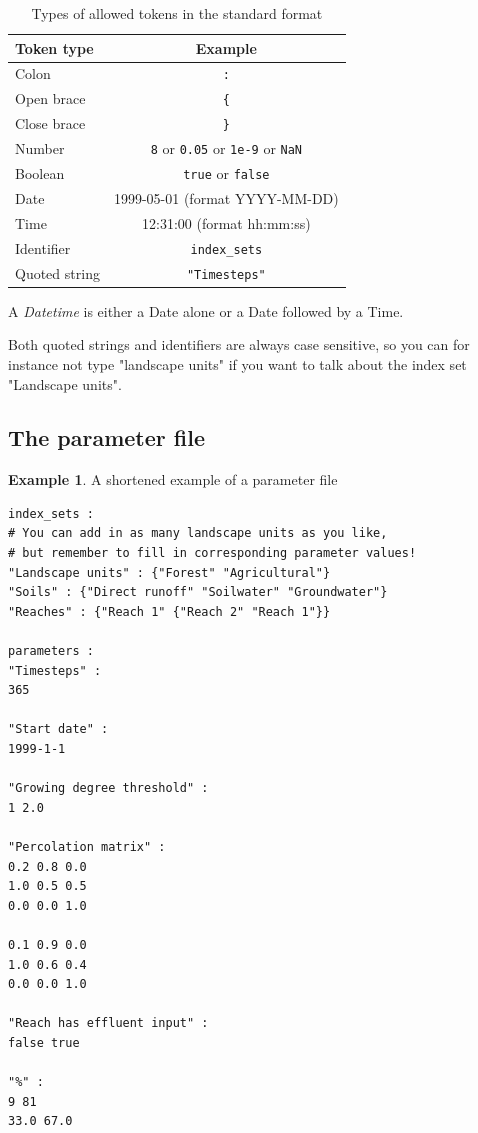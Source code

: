 \documentclass[11pt]{article}
\theoremstyle{definition}
\newtheorem{myexample}{Example}
\newenvironment{example}%
  {\begin{lrbox}{\examplebox}%
   \begin{minipage}{\dimexpr\linewidth-2\fboxsep}
   \begin{myexample}}%
  {\end{myexample}%
   \end{minipage}%
   \end{lrbox}%
   \begin{trivlist}
     \item[]\colorbox{silver}{\usebox\examplebox}
   \end{trivlist}}
\begin{document}
\begin{table}[H]
\centering
\label{tab:tokens}
\begin{tabular}{|l|c|}
\hline
{\bf Token type} & {\bf Example} \\
\hline
Colon & {\tt :}  \\
\hline
Open brace & {\tt \{} \\
\hline
Close brace & {\tt \}} \\
\hline
Number & {\tt 8} or {\tt 0.05} or {\tt 1e-9} or {\tt NaN} \\
\hline
Boolean &{\tt  true} or {\tt false} \\
\hline
Date & 1999-05-01 (format YYYY-MM-DD) \\
\hline
Time & 12:31:00 (format hh:mm:ss) \\
\hline
Identifier & {\tt index\_sets} \\
\hline
Quoted string & {\tt "Timesteps"} \\
\hline
\end{tabular}
\caption{Types of allowed tokens in the standard format}
\end{table}

A \emph{Datetime} is either a Date alone or a Date followed by a Time.

Both quoted strings and identifiers are always case sensitive, so you can for instance not type "landscape units" if you want to talk about the index set "Landscape units".

\subsection{The parameter file}

\begin{example}\label{ex:parameterfile}
A shortened example of a parameter file
\begin{lstlisting}
index_sets :
# You can add in as many landscape units as you like,
# but remember to fill in corresponding parameter values!
"Landscape units" : {"Forest" "Agricultural"}
"Soils" : {"Direct runoff" "Soilwater" "Groundwater"}
"Reaches" : {"Reach 1" {"Reach 2" "Reach 1"}}

parameters :
"Timesteps" :
365

"Start date" :
1999-1-1

"Growing degree threshold" :
1 2.0

"Percolation matrix" :
0.2 0.8 0.0
1.0 0.5 0.5
0.0 0.0 1.0

0.1 0.9 0.0
1.0 0.6 0.4
0.0 0.0 1.0

"Reach has effluent input" :
false true

"%" :
9 81
33.0 67.0
\end{lstlisting}
\end{example}
\end{document}
